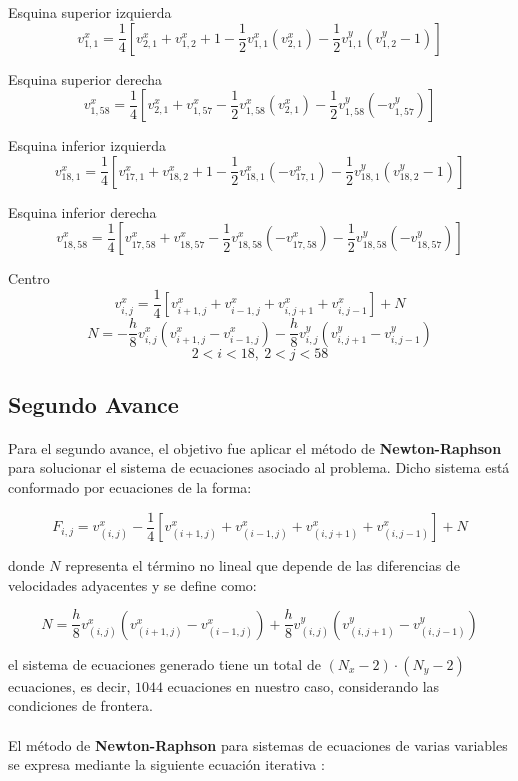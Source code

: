 \documentclass{article}
\begin{document}
  Esquina superior izquierda
  \[v_{1,1}^x=\frac{1}{4}[v_{2,1}^x+v_{1,2}^x+1-\frac{1}{2}v_{1,1}^x(v_{2,1}^x)-\frac{1}{2}v_{1,1}^y(v_{1,2}^y-1)]\]

  Esquina superior derecha
  \[v_{1,58}^x=\frac{1}{4}[v_{2,1}^x+v_{1,57}^x-\frac{1}{2}v_{1,58}^x(v_{2,1}^x)-\frac{1}{2}v_{1,58}^y(-v_{1,57}^y)]\]

  Esquina inferior izquierda
  \[v_{18,1}^x=\frac{1}{4}[v_{17,1}^x+v_{18,2}^x+1-\frac{1}{2}v_{18,1}^x(-v_{17,1}^x)-\frac{1}{2}v_{18,1}^y(v_{18,2}^y-1)]\]

  Esquina inferior derecha
  \[v_{18,58}^x=\frac{1}{4}[v_{17,58}^x+v_{18,57}^x-\frac{1}{2}v_{18,58}^x(-v_{17,58}^x)-\frac{1}{2}v_{18,58}^y(-v_{18,57}^y)]\]

  Centro
  \[v_{i,j}^x=\frac{1}{4}[v_{i+1,j}^x+v_{i-1,j}^x+v_{i,j+1}^x+v_{i,j-1}^x]+N\]
  \[N=-\frac{h}{8}v_{i,j}^x(v_{i+1,j}^x-v_{i-1,j}^x)-\frac{h}{8}v_{i,j}^y(v_{i,j+1}^y-v_{i,j-1}^y)\]
  \[2<i<18, \ 2<j<58\]

  \subsection*{Segundo Avance}
  \paragraph{}
  Para el segundo avance, el objetivo fue aplicar el método de \textbf{Newton-Raphson} para solucionar el sistema de ecuaciones asociado al problema. Dicho sistema está conformado por ecuaciones de la forma:

  \[
  F_{i,j} = v_{(i,j)}^x - \frac{1}{4} \left[v_{(i+1,j)}^x + v_{(i-1,j)}^x + v_{(i,j+1)}^x + v_{(i,j-1)}^x \right] + N
  \]

  donde \(N\) representa el término no lineal que depende de las diferencias de velocidades adyacentes y se define como:

  \[
  N = \frac{h}{8}v_{(i,j)}^x \left(v_{(i+1,j)}^x - v_{(i-1,j)}^x \right) + \frac{h}{8}v_{(i,j)}^y \left(v_{(i,j+1)}^y - v_{(i,j-1)}^y \right)
  \]

  el sistema de ecuaciones generado tiene un total de \((N_x - 2) \cdot (N_y - 2)\) ecuaciones, es decir, \(1044\) ecuaciones en nuestro caso, considerando las condiciones de frontera.

  \paragraph{}
  El método de \textbf{Newton-Raphson} para sistemas de ecuaciones de varias variables se expresa mediante la siguiente ecuación iterativa \cite{kincaid1}:
\end{document}
